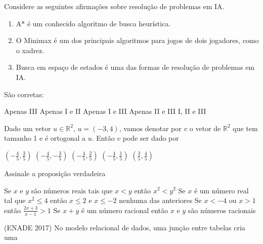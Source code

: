 \documentclass[12pt, addpoints]{exam}
\begin{document}
\begin{questions}
\question

Considere as seguintes afirmações sobre resolução de problemas em IA.

\begin{enumerate}[label=\Roman*.]

    \item A* é um conhecido algoritmo de busca heurística.

    \item O Minimax é um dos principais algoritmos para jogos de dois jogadores, como o xadrez.

    \item Busca em espaço de estados é uma das formas de resolução de problemas em IA.

\end{enumerate}

São corretas:
\begin{choices}
\choice Apenas III
\choice Apenas I e II
\choice Apenas I e III
\choice Apenas II e III
\choice I, II e III
\end{choices}

\question

Dado um vetor \( u \in \mathbb{R}^2 \), \( u = (-3, 4) \), vamos denotar por \( v \) o vetor de \( \mathbb{R}^2 \) que tem tamanho 1 e é ortogonal a \( u \). Então \( v \) pode ser dado por


\begin{choices}
\choice \( \left( -\frac{4}{5}, \frac{3}{5} \right) \)
\choice \( \left( -\frac{4}{5}, -\frac{3}{5} \right) \)
\choice \( \left( -\frac{4}{5}, \frac{2}{5} \right) \)
\choice \( \left( -\frac{4}{5}, \frac{1}{5} \right) \)
\choice \( \left( \frac{3}{5}, \frac{4}{5} \right) \)
\end{choices}

\question

Assinale a proposição verdadeira


\begin{choices}
\choice Se \( x \) e \( y \) são números reais tais que \( x < y \) então \( x^2 < y^2 \)
\choice Se \( x \) é um número real tal que \( x^2 \leq 4 \) então \( x \leq 2 \) e \( x \leq -2 \)
\choice nenhuma das anteriores
\choice Se \( x < -4 \) ou \( x > 1 \) então \( \frac{2x + 3}{x - 1} > 1 \)
\choice Se \( x + y \) é um número racional então \( x \) e \( y \) são números racionais
\end{choices}

\question

(ENADE 2017) No modelo relacional de dados, uma junção entre tabelas cria uma


\end{questions}
\end{document}
